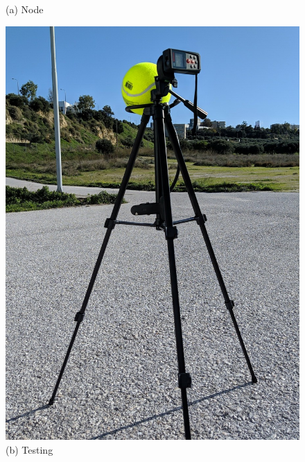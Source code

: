 \begin{figure} [H]
\begin{minipage}{.5\textwidth}
      {(a) Node }
    \end{minipage}%
    \begin{minipage}{.5\textwidth}
      \centering
      \includegraphics[width=\linewidth, angle =-90]{../Images/Experiments-Results/testing.jpg}\\
      {(b) Testing }
	\end{minipage}
    \hfill \break
    \decoRule
    \label{fig:color-space}
\end{figure}

